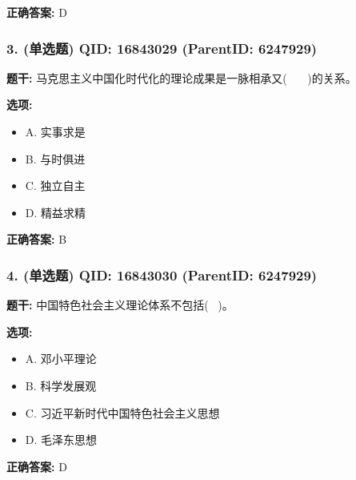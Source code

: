 \documentclass[12pt,UTF8]{ctexart}
\begin{document}
\textbf{正确答案:}
D

\vspace{0.3em}\hrulefill\vspace{0.7em}

\subsubsection*{3. (单选题) \small QID: 16843029 (ParentID: 6247929)}

\textbf{题干:}
马克思主义中国化时代化的理论成果是一脉相承又(    )的关系。



\textbf{选项:}
\begin{itemize}[leftmargin=*]

  \item A. 实事求是

  \item B. 与时俱进

  \item C. 独立自主

  \item D. 精益求精

\end{itemize}

\textbf{正确答案:}
B

\vspace{0.3em}\hrulefill\vspace{0.7em}

\subsubsection*{4. (单选题) \small QID: 16843030 (ParentID: 6247929)}

\textbf{题干:}
中国特色社会主义理论体系不包括(  )。



\textbf{选项:}
\begin{itemize}[leftmargin=*]

  \item A. 邓小平理论

  \item B. 科学发展观

  \item C. 习近平新时代中国特色社会主义思想

  \item D. 毛泽东思想

\end{itemize}

\textbf{正确答案:}
D
\end{document}
